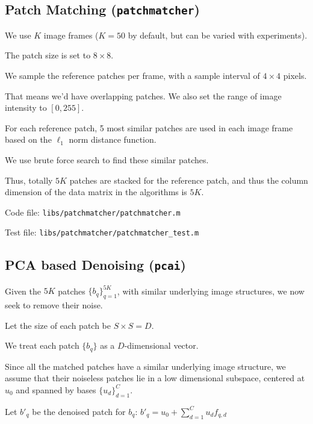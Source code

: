 \documentclass[fleqn, 11pt]{article}
\begin{document}
\bigskip

\subsection*{Patch Matching (\texttt{patchmatcher})}

We use $K$ image frames ($K=50$ by default, but can be varied with experiments).

The patch size is set to $8 \times 8$. 

We sample the reference patches per frame, with a sample interval of 
$4 \times 4$ pixels. 

That means we'd have overlapping patches. 
We also set the range of image intensity to $[0, 255]$.

\medskip

For each reference patch, 5 most similar patches are used in each image frame based on the $\ell_1$ norm distance function.

We use brute force search to find these similar patches. 

Thus, totally $5K$ patches are stacked for the reference patch, and thus the column dimension of the data matrix in the algorithms is $5K$.

\medskip

Code file: \texttt{libs/patchmatcher/patchmatcher.m}

Test file: \texttt{libs/patchmatcher/patchmatcher\_test.m}

\bigskip 

\subsection*{PCA based Denoising (\texttt{pcai})}

Given the $5K$ patches $\{b_q\}_{q=1}^{5K}$, with similar underlying
image structures, we now seek to remove their noise. 

\medskip

Let the
size of each patch be $S \times S = D$. 

We treat each patch $\{b_q\}$ as a
$D$-dimensional vector. 

\medskip

Since all the matched patches have a similar underlying image structure, 
we assume that their noiseless patches lie in a low dimensional subspace, 
centered at $u_0$ and spanned by bases $\{u_d\}_{d=1}^C$. 

\medskip

Let $b'_q$ be the denoised patch for $b_q$: $b'_q = u_0 + \sum_{d=1}^C u_d f_{q,d}$
\end{document}
